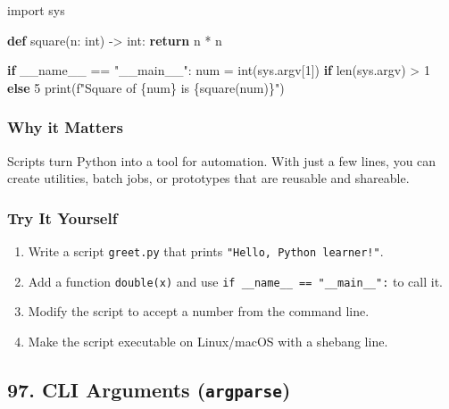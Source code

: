 \documentclass[
  letterpaper,
  DIV=11,
  numbers=noendperiod]{scrreprt}
\newenvironment{Shaded}{\begin{snugshade}}{\end{snugshade}}
\newcommand{\BuiltInTok}[1]{\textcolor[rgb]{0.00,0.23,0.31}{#1}}
\newcommand{\ControlFlowTok}[1]{\textcolor[rgb]{0.00,0.23,0.31}{\textbf{#1}}}
\newcommand{\DecValTok}[1]{\textcolor[rgb]{0.68,0.00,0.00}{#1}}
\newcommand{\ImportTok}[1]{\textcolor[rgb]{0.00,0.46,0.62}{#1}}
\newcommand{\KeywordTok}[1]{\textcolor[rgb]{0.00,0.23,0.31}{\textbf{#1}}}
\newcommand{\NormalTok}[1]{\textcolor[rgb]{0.00,0.23,0.31}{#1}}
\newcommand{\OperatorTok}[1]{\textcolor[rgb]{0.37,0.37,0.37}{#1}}
\newcommand{\SpecialCharTok}[1]{\textcolor[rgb]{0.37,0.37,0.37}{#1}}
\newcommand{\SpecialStringTok}[1]{\textcolor[rgb]{0.13,0.47,0.30}{#1}}
\newcommand{\StringTok}[1]{\textcolor[rgb]{0.13,0.47,0.30}{#1}}
\newcommand{\VariableTok}[1]{\textcolor[rgb]{0.07,0.07,0.07}{#1}}
\providecommand{\tightlist}{%
  \setlength{\itemsep}{0pt}\setlength{\parskip}{0pt}}
\begin{document}
\begin{Shaded}
\begin{Highlighting}[]
\ImportTok{import}\NormalTok{ sys}

\KeywordTok{def}\NormalTok{ square(n: }\BuiltInTok{int}\NormalTok{) }\OperatorTok{{-}\textgreater{}} \BuiltInTok{int}\NormalTok{:}
    \ControlFlowTok{return}\NormalTok{ n }\OperatorTok{*}\NormalTok{ n}

\ControlFlowTok{if} \VariableTok{\_\_name\_\_} \OperatorTok{==} \StringTok{"\_\_main\_\_"}\NormalTok{:}
\NormalTok{    num }\OperatorTok{=} \BuiltInTok{int}\NormalTok{(sys.argv[}\DecValTok{1}\NormalTok{]) }\ControlFlowTok{if} \BuiltInTok{len}\NormalTok{(sys.argv) }\OperatorTok{\textgreater{}} \DecValTok{1} \ControlFlowTok{else} \DecValTok{5}
    \BuiltInTok{print}\NormalTok{(}\SpecialStringTok{f"Square of }\SpecialCharTok{\{}\NormalTok{num}\SpecialCharTok{\}}\SpecialStringTok{ is }\SpecialCharTok{\{}\NormalTok{square(num)}\SpecialCharTok{\}}\SpecialStringTok{"}\NormalTok{)}
\end{Highlighting}
\end{Shaded}

\subsubsection{Why it Matters}\label{why-it-matters-95}

Scripts turn Python into a tool for automation. With just a few lines,
you can create utilities, batch jobs, or prototypes that are reusable
and shareable.

\subsubsection{Try It Yourself}\label{try-it-yourself-95}

\begin{enumerate}
\def\labelenumi{\arabic{enumi}.}
\tightlist
\item
  Write a script \texttt{greet.py} that prints
  \texttt{"Hello,\ Python\ learner!"}.
\item
  Add a function \texttt{double(x)} and use
  \texttt{if\ \_\_name\_\_\ ==\ "\_\_main\_\_":} to call it.
\item
  Modify the script to accept a number from the command line.
\item
  Make the script executable on Linux/macOS with a shebang line.
\end{enumerate}

\subsection{\texorpdfstring{97. CLI Arguments
(\texttt{argparse})}{97. CLI Arguments (argparse)}}\label{cli-arguments-argparse}
\end{document}
